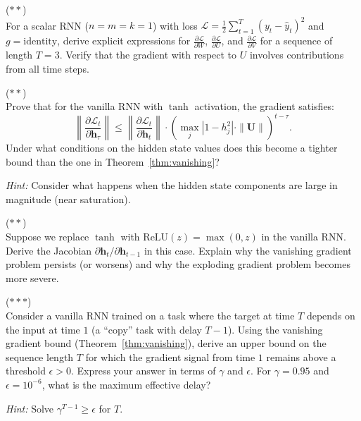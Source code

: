 \documentclass[11pt,a4paper]{article}
\begin{document}
\begin{exercise}
\textnormal{(\(\ast\ast\))} \\
For a scalar RNN ($n = m = k = 1$) with loss
$\mathcal{L} = \frac{1}{2}\sum_{t=1}^T (y_t - \hat{y}_t)^2$ and
$g = \text{identity}$, derive explicit expressions for
$\frac{\partial \mathcal{L}}{\partial W}$,
$\frac{\partial \mathcal{L}}{\partial U}$, and
$\frac{\partial \mathcal{L}}{\partial V}$ for a sequence of length
$T = 3$.  Verify that the gradient with respect to $U$ involves
contributions from all time steps.
\end{exercise}

\begin{exercise}
\textnormal{(\(\ast\ast\))} \\
Prove that for the vanilla RNN with $\tanh$ activation, the gradient
satisfies:
\[
  \left\|\frac{\partial \mathcal{L}_t}{\partial \mathbf{h}_\tau}
  \right\| \leq \left\|\frac{\partial \mathcal{L}_t}
    {\partial \mathbf{h}_t}\right\| \cdot
    \left(\max_j |1 - h_j^2| \cdot \|\mathbf{U}\|\right)^{t-\tau}.
\]
Under what conditions on the hidden state values does this become
a tighter bound than the one in Theorem~\ref{thm:vanishing}?

\textit{Hint:} Consider what happens when the hidden state components
are large in magnitude (near saturation).
\end{exercise}

\begin{exercise}
\textnormal{(\(\ast\ast\))} \\
Suppose we replace $\tanh$ with $\text{ReLU}(z) = \max(0, z)$ in the
vanilla RNN.  Derive the Jacobian
$\partial \mathbf{h}_t / \partial \mathbf{h}_{t-1}$ in this case.
Explain why the vanishing gradient problem persists (or worsens) and
why the exploding gradient problem becomes more severe.
\end{exercise}

\begin{exercise}
\textnormal{(\(\ast\ast\ast\))} \\
Consider a vanilla RNN trained on a task where the target at time $T$
depends on the input at time $1$ (a ``copy'' task with delay $T-1$).
Using the vanishing gradient bound (Theorem~\ref{thm:vanishing}),
derive an upper bound on the sequence length $T$ for which the
gradient signal from time $1$ remains above a threshold
$\epsilon > 0$.  Express your answer in terms of $\gamma$ and
$\epsilon$.  For $\gamma = 0.95$ and
$\epsilon = 10^{-6}$, what is the maximum effective delay?

\textit{Hint:} Solve $\gamma^{T-1} \geq \epsilon$ for $T$.
\end{exercise}
\end{document}
